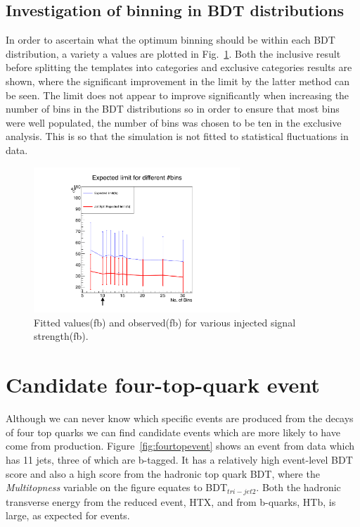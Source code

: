 \subsection{Investigation of binning in BDT distributions \label{appsub:binning}}

In order to ascertain what the optimum binning should be within each BDT distribution, a variety a values are plotted in Fig.~\ref{fig:Binning}. Both the inclusive result before splitting the templates into \njets categories and exclusive \njets categories results are shown, where the significant improvement in the limit by the latter method can be seen. The limit does not appear to improve significantly when increasing the number of bins in the BDT distributions so in order to ensure that most bins were well populated, the number of bins was chosen to be ten in the exclusive analysis. This is so that the simulation is not fitted to statistical fluctuations in data.

\begin{figure}[ht!]
\centering
    \includegraphics[width=0.69\textwidth]{images/Run1/BinningPrint.pdf}
    \caption{Fitted values(fb) and observed(fb) for various injected signal strength(fb).}
    \label{fig:Binning}
\end{figure}

\section{Candidate four-top-quark event}

Although we can never know which specific events are produced from the decays of four top quarks we can find candidate events which are more likely to have come from \tttt production. Figure~\ref{fig:fourtopevent} shows an event from data which has 11 jets, three of which are b-tagged. It has a relatively high event-level BDT score and also a high score from the hadronic top quark BDT, where the \emph{Multitopness} variable on the figure equates to BDT$_{tri-jet2}$. Both the hadronic transverse energy from the reduced event, HTX, and from b-quarks, HTb, is large, as expected for \tttt events. 

